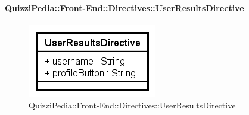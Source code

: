 \paragraph{QuizziPedia::Front-End::Directives::UserResultsDirective}

\label{QuizziPedia::Front-End::Directives::UserResultsDirective}

\begin{figure}[h]
	\centering
	\includegraphics[scale=0.80,keepaspectratio]{UML/Classi/Front-End/QuizziPedia_Front-end_Directives_UserResultsDirective.png}
	\caption{QuizziPedia::Front-End::Directives::UserResultsDirective}
\end{figure}

